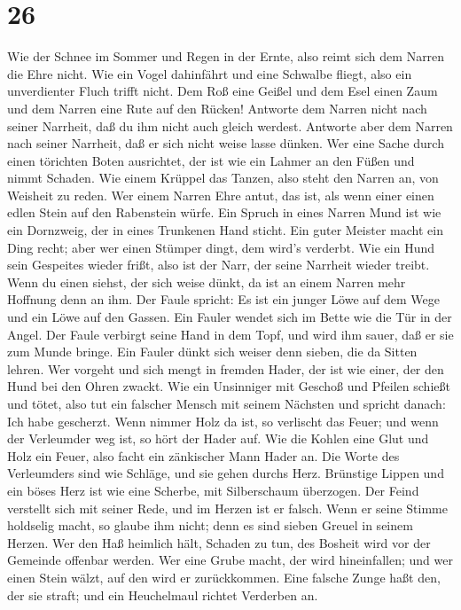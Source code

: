 \hypertarget{section-25}{%
\section{26}\label{section-25}}

 Wie der Schnee im Sommer und Regen in der Ernte, also reimt
sich dem Narren die Ehre nicht.  Wie ein Vogel dahinfährt
und eine Schwalbe fliegt, also ein unverdienter Fluch trifft nicht.
 Dem Roß eine Geißel und dem Esel einen Zaum und dem Narren
eine Rute auf den Rücken!  Antworte dem Narren nicht nach
seiner Narrheit, daß du ihm nicht auch gleich werdest. 
Antworte aber dem Narren nach seiner Narrheit, daß er sich nicht weise
lasse dünken.  Wer eine Sache durch einen törichten Boten
ausrichtet, der ist wie ein Lahmer an den Füßen und nimmt Schaden.
 Wie einem Krüppel das Tanzen, also steht den Narren an, von
Weisheit zu reden.  Wer einem Narren Ehre antut, das ist,
als wenn einer einen edlen Stein auf den Rabenstein würfe. 
Ein Spruch in eines Narren Mund ist wie ein Dornzweig, der in eines
Trunkenen Hand sticht.  Ein guter Meister macht ein Ding
recht; aber wer einen Stümper dingt, dem wird's verderbt. 
Wie ein Hund sein Gespeites wieder frißt, also ist der Narr, der seine
Narrheit wieder treibt.  Wenn du einen siehst, der sich
weise dünkt, da ist an einem Narren mehr Hoffnung denn an ihm.
 Der Faule spricht: Es ist ein junger Löwe auf dem Wege und
ein Löwe auf den Gassen.  Ein Fauler wendet sich im Bette
wie die Tür in der Angel.  Der Faule verbirgt seine Hand in
dem Topf, und wird ihm sauer, daß er sie zum Munde bringe. 
Ein Fauler dünkt sich weiser denn sieben, die da Sitten lehren.
 Wer vorgeht und sich mengt in fremden Hader, der ist wie
einer, der den Hund bei den Ohren zwackt.  Wie ein
Unsinniger mit Geschoß und Pfeilen schießt und tötet,  also
tut ein falscher Mensch mit seinem Nächsten und spricht danach: Ich habe
gescherzt.  Wenn nimmer Holz da ist, so verlischt das
Feuer; und wenn der Verleumder weg ist, so hört der Hader auf.
 Wie die Kohlen eine Glut und Holz ein Feuer, also facht
ein zänkischer Mann Hader an.  Die Worte des Verleumders
sind wie Schläge, und sie gehen durchs Herz.  Brünstige
Lippen und ein böses Herz ist wie eine Scherbe, mit Silberschaum
überzogen.  Der Feind verstellt sich mit seiner Rede, und
im Herzen ist er falsch.  Wenn er seine Stimme holdselig
macht, so glaube ihm nicht; denn es sind sieben Greuel in seinem Herzen.
 Wer den Haß heimlich hält, Schaden zu tun, des Bosheit
wird vor der Gemeinde offenbar werden.  Wer eine Grube
macht, der wird hineinfallen; und wer einen Stein wälzt, auf den wird er
zurückkommen.  Eine falsche Zunge haßt den, der sie straft;
und ein Heuchelmaul richtet Verderben an.

